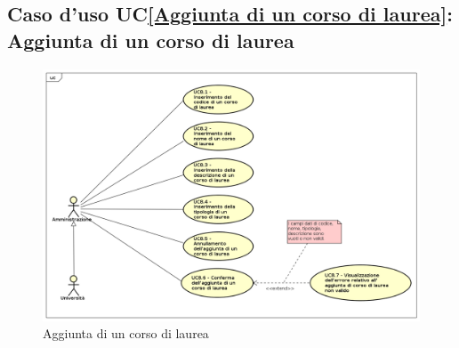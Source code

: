\subsection{Caso d'uso UC\ref{Aggiunta di un corso di laurea}: Aggiunta di un corso di laurea}
\begin{figure} [H]
	\centering
	\includegraphics[scale=0.45]{./img/UseCaseDiagram08.png}
	\caption{Aggiunta di un corso di laurea}\label{}
\end{figure}
